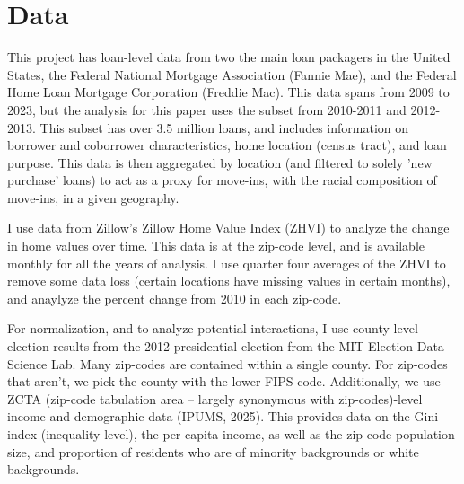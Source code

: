 \documentclass{article}
\begin{document}
\section{Data}
This project has loan-level data from two the main loan packagers in the United States, the Federal National Mortgage Association (Fannie Mae), and the Federal Home Loan Mortgage Corporation (Freddie Mac). This data spans from 2009 to 2023, but the analysis for this paper uses the subset from 2010-2011 and 2012-2013. This subset has over 3.5 million loans, and includes information on borrower and coborrower characteristics, home location (census tract), and loan purpose. This data is then aggregated by location (and filtered to solely 'new purchase' loans) to act as a proxy for move-ins, with the racial composition of move-ins, in a given geography.

I use data from Zillow's Zillow Home Value Index (ZHVI) to analyze the change in home values over time. This data is at the zip-code level, and is available monthly for all the years of analysis. I use quarter four averages of the ZHVI to remove some data loss (certain locations have missing values in certain months), and anaylyze the percent change from 2010 in each zip-code.

For normalization, and to analyze potential interactions, I use county-level election results from the 2012 presidential election from the MIT Election Data Science Lab. Many zip-codes are contained within a single county. For zip-codes that aren't, we pick the county with the lower FIPS code. Additionally, we use ZCTA (zip-code tabulation area -- largely synonymous with zip-codes)-level income and demographic data (IPUMS, 2025). This provides data on the Gini index (inequality level), the per-capita income, as well as the zip-code population size, and proportion of residents who are of minority backgrounds or white backgrounds.
\end{document}
